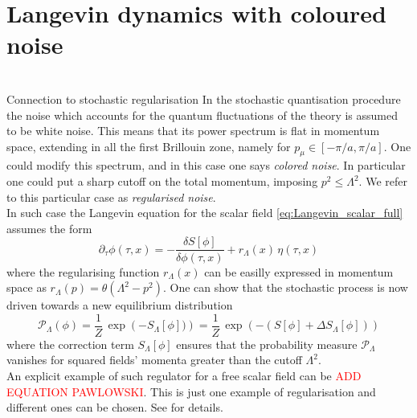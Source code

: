 \section{Langevin dynamics with coloured noise}
\label{sec:coloured_noise}
 \\
Connection to stochastic regularisation \cite{boo}
In the stochastic quantisation procedure the noise which accounts for the quantum fluctuations of the theory is assumed to be white noise. This means that its power spectrum is flat in momentum space, extending in all the first Brillouin zone, namely for $p_\mu \in [-\pi/a, \pi/a]$. One could modify this spectrum, and in this case one says \emph{colored noise}. In particular one could put a sharp cutoff on the total momentum, imposing $p^2 \leq \Lambda^2$. We refer to this particular case as \emph{regularised noise}. \\
In such case the Langevin equation for the scalar field \eqref{eq:Langevin_scalar_full} assumes the form
\begin{equation*}
    \partial_\tau \phi(\tau, x) = - \frac{\delta S[\phi]}{\delta \phi (\tau, x)} + r_\Lambda (x) \, \eta (\tau, x)
    \label{eq:Langevin_scalar_regularised}
\end{equation*}
where the regularising function $r_\Lambda(x)$ can be easilly expressed in momentum space as $r_\Lambda(p) = \theta(\Lambda^2 - p^2)$. One can show \cite{Pawlowski2017CoolingNoise} that the stochastic process is now driven towards a new equilibrium distribution
\begin{equation}
    \mathcal{P}_\Lambda(\phi) = \frac{1}{Z} \, \exp\left(-S_\Lambda[\phi])\right) = \frac{1}{Z} \, \exp\left(-(S[\phi] + \Delta S_\Lambda[\phi])\right)
    \label{eq:probability_field_configuration_regularised}
\end{equation}
where the correction term $S_\Lambda[\phi]$ ensures that the probability measure $\mathcal{P}_\Lambda$ vanishes for squared fields' momenta greater than the cutoff $\Lambda^2$. \\
An explicit example of such regulator for a free scalar field can be \textcolor{red}{ADD EQUATION PAWLOWSKI}.
This is just one example of regularisation and different ones can be chosen. See \cite{Pawlowski2017CoolingNoise} for details.


